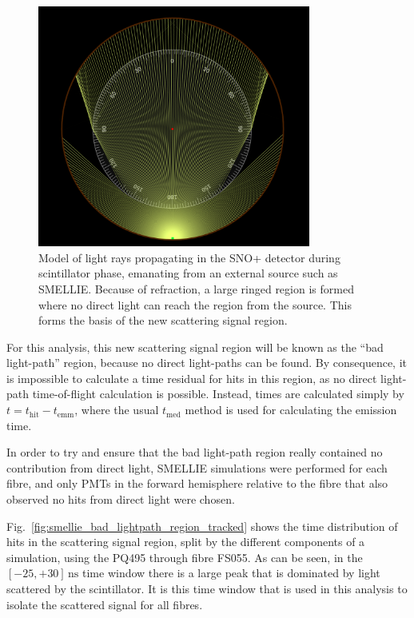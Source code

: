 \begin{figure}
    \centering
    \includegraphics[width=0.8\textwidth]{5_SMELLIEAnalysis/images/smellie_scattering_region_ray_optics_model.png}
    \caption[Model of light rays propagating in the SNO+ detector during scintillator phase, emanating from an external source such as SMELLIE]
    {Model of light rays propagating in the SNO+ detector during scintillator phase, emanating from an external source such as SMELLIE. Because of refraction, a large ringed region is formed where no direct light can reach the region from the source. This forms the basis of the new scattering signal region.}
    \label{fig:smellie_propagation_toy_model}
\end{figure}

For this analysis, this new scattering signal region will be known as the ``bad light-path'' region, because no direct light-paths can be found. By consequence, it is impossible to calculate a time residual for hits in this region, as no direct light-path time-of-flight calculation is possible. Instead, times are calculated simply by $t = t_{\mathrm{hit}}-t_{\mathrm{emm}}$, where the usual $t_{\mathrm{med}}$ method is used for calculating the emission time.

In order to try and ensure that the bad light-path region really contained no contribution from direct light, SMELLIE simulations were performed for each fibre, and only PMTs in the forward hemisphere relative to the fibre that also observed no hits from direct light were chosen. %

Fig.~\ref{fig:smellie_bad_lightpath_region_tracked} shows the time distribution of hits in the scattering signal region, split by the different components of a simulation, using the PQ495 through fibre FS055. As can be seen, in the $[-25,+30]\,\si{\ns}$ time window there is a large peak that is dominated by light scattered by the scintillator. It is this time window that is used in this analysis to isolate the scattered signal for all fibres. 

